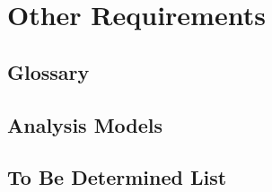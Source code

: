 \documentclass{article}
\newcommand{\comment}[1]{}
\begin{document}
\section{Other Requirements}
\comment{
Define any other requirements not covered elsewhere in the \acrshort{srs}. This might include database requirements, internationalization requirments, legal requirments, reuse objectives for the projects, and so on. Add any new sections that are pertinent to the project.
	}	
\subsection{Glossary}
\comment{
Define all the terms necessary to properly interpret the \acrshort{srs}, including acronyms and abbreviations. You may wish to build a seperate gglossary that spans multiple projects or the entire organization, and just include terms specific to a single project in each \acrshort{srs}.
	}
\printglossary[type=\acronymtype]
 
\printglossary

\subsection{Analysis Models}
\comment{
Optionally, include any pertinent analysis models, such as data flow diagrams, class diagrams, state-transition diagrams, or entity-relationship diagrams.
	}
\subsection{To Be Determined List}
\comment{
Collect a numbered list of the \acrshort{tbd} (to be determined) references in the \acrshort{srs} so they can be tracked for closure.
	}
\end{document}
